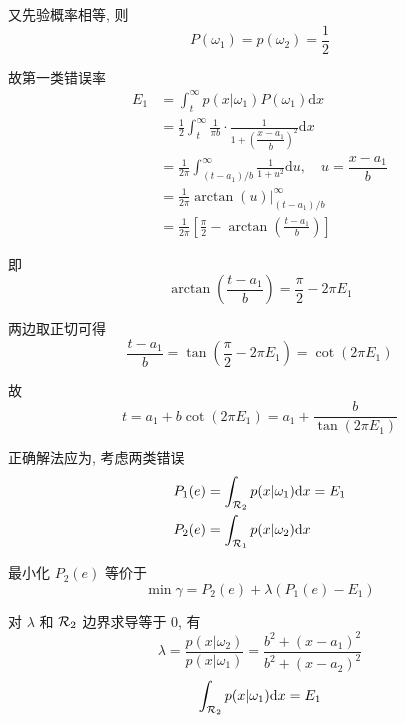 \documentclass{article}
\begin{document}
又先验概率相等, 则
\begin{equation}
  P(\omega_1)=p(\omega_2)=\frac{1}{2}
\end{equation}

故第一类错误率
\begin{equation}
  \begin{aligned}
    E_1
    &=\int_t^\infty p(x|\omega_1)P(\omega_1)\mathrm{d}x\\
    &=\frac{1}{2}\int_t^\infty \frac{1}{\pi b} \cdot \frac{1}{1+\left(\dfrac{x-a_1}{b}\right)^2}\mathrm{d}x\\
    &=\frac{1}{2\pi}\int_{(t-a_1)/b}^\infty \frac{1}{1+u^2}\mathrm{d}u,\quad u=\dfrac{x-a_1}{b}\\
    &=\frac{1}{2\pi}\arctan(u)\Big|_{(t-a_1)/b}^\infty\\
    &=\frac{1}{2\pi}\left[\frac{\pi}{2}-\arctan\left(\frac{t-a_1}{b}\right)\right]
  \end{aligned}
\end{equation}

即
\begin{equation}
  \arctan\left(\frac{t-a_1}{b}\right)=\frac{\pi}{2}-2\pi E_1
\end{equation}

两边取正切可得
\begin{equation}
  \frac{t-a_1}{b}=\tan\left(\frac{\pi}{2}-2\pi E_1\right)=\cot(2\pi E_1)
\end{equation}

故
\begin{equation}
  t=a_1+b\cot(2\pi E_1)=a_1+\frac{b}{\tan(2\pi E_1)}
\end{equation}

正确解法应为, 考虑两类错误
\begin{equation}
  \begin{aligned}
    P_1(e)&=\int_{\mathcal{R}_2}p(x|\omega_1)\mathrm{d}x=E_1\\
    P_2(e)&=\int_{\mathcal{R}_1}p(x|\omega_2)\mathrm{d}x\\
  \end{aligned}
\end{equation}

最小化 $P_2(e)$ 等价于
\begin{equation}
  \min\gamma=P_2(e)+\lambda(P_1(e)-E_1)
\end{equation}

对 $\lambda$ 和 $\mathcal{R}_2$ 边界求导等于 0, 有
\begin{equation}
    \lambda=\frac{p(x|\omega_2)}{p(x|\omega_1)}=\frac{b^2+(x-a_1)^2}{b^2+(x-a_2)^2}
\end{equation}
\begin{equation}
  \int_{\mathcal{R}_2}p(x|\omega_1)\mathrm{d}x=E_1
\end{equation}
\end{document}
